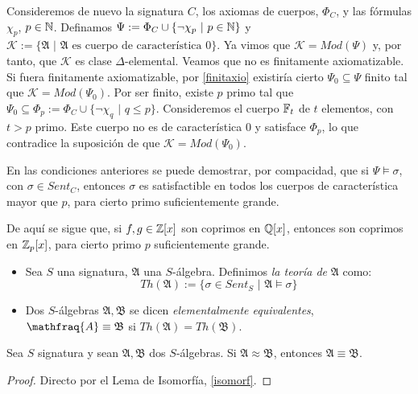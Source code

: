 \begin{example}
Consideremos de nuevo la signatura $C$, los axiomas de cuerpos, $\Phi_C$, y las fórmulas $\chi_p$, $p \in \mathbb{N}$. Definamos $\Psi := \Phi_C \cup \{\neg\chi_p \, \, | \, \, p\in \mathbb{N} \}$ y $\mathcal{K} :=\{\mathfrak{A} \, \, | \, \, \mathfrak{A} \text{ es cuerpo de característica 0}\}$. Ya vimos que $\mathcal{K} = Mod(\Psi)$ y, por tanto, que $\mathcal{K}$ es clase $\Delta$-elemental. Veamos que no es finitamente axiomatizable.\\

Si fuera finitamente axiomatizable, por \ref{finitaxio} existiría cierto $\Psi_0 \subseteq \Psi$ finito tal que $\mathcal{K} = Mod(\Psi_0)$. Por ser finito, existe $p$ primo tal que $\Psi_0 \subseteq \Phi_p := \Phi_C \cup \{\neg\chi_q \, \, | \, \, q \leq p \}$. Consideremos el cuerpo $\mathbb{F}_t$ de $t$ elementos, con $t > p$ primo. Este cuerpo no es de característica 0 y satisface $\Phi_p$, lo que contradice la suposición de que $\mathcal{K} = Mod(\Psi_0)$.
\end{example}


\begin{example}
En las condiciones anteriores se puede demostrar, por compacidad, que si $\Psi \vDash \sigma$, con $\sigma \in Sent_C$, entonces $\sigma$ es satisfactible en todos los cuerpos de característica mayor que $p$, para cierto primo suficientemente grande.

De aquí se sigue que, si $f, g \in \mathbb{Z}[x]$ son coprimos en $\mathbb{Q}[x]$, entonces son coprimos en $\mathbb{Z}_p[x]$, para cierto primo $p$ suficientemente grande.
\end{example}

\begin{defs}
\begin{itemize}\mbox{}
    \item Sea $S$ una signatura, $\mathfrak{A}$ una $S$-álgebra. Definimos \textit{la teoría de} $\mathfrak{A}$ como:
$$Th(\mathfrak{A}) := \{\sigma \in Sent_S \, \, | \, \, \mathfrak{A}\vDash \sigma\}$$
    \item Dos $S$-álgebras $\mathfrak{A}, \mathfrak{B}$ se dicen \textit{elementalmente equivalentes}, $\mathfraq{A} \equiv \mathfrak{B}$ si $Th(\mathfrak{A}) = Th(\mathfrak{B})$.
\end{itemize}
\end{defs}

\begin{prop}\label{equiso}
Sea $S$ signatura y sean $\mathfrak{A}, \mathfrak{B}$ dos $S$-álgebras. Si $\mathfrak{A} \approx \mathfrak{B}$, entonces $\mathfrak{A} \equiv \mathfrak{B}$.
\end{prop}
\begin{proof}
Directo por el Lema de Isomorfía, \ref{isomorf}.
\end{proof}

